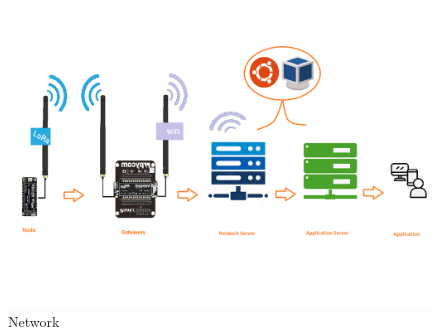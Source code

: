\begin{figure}[hb]\centering
     \includegraphics[scale=0.25]{figs/network.png}
	\caption{Network}\label{fig:network}
\end{figure}




 



